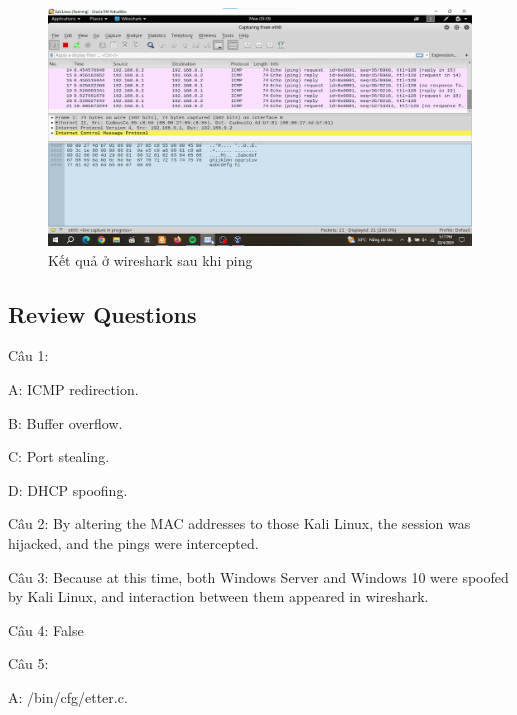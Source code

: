 \begin{figure}[!htb]
    \centering
    \includegraphics[width=1\linewidth]{figure//chapter5//lab5_3/final_result.png}
    \caption{Kết quả ở wireshark sau khi ping}
    \label{fig:enter-label}
\end{figure}

\subsection{Review Questions}

\noindent Câu 1:

A: ICMP redirection.

B: Buffer overflow.

C: Port stealing.

D: DHCP spoofing.

\noindent Câu 2: By altering the MAC addresses to those Kali Linux, the session was hijacked, and the pings were intercepted.

\noindent Câu 3: Because at this time, both Windows Server and Windows 10 were spoofed by Kali Linux, and interaction between them appeared in wireshark.

\noindent Câu 4: False

\noindent Câu 5:

A: /bin/cfg/etter.c.

\newpage


